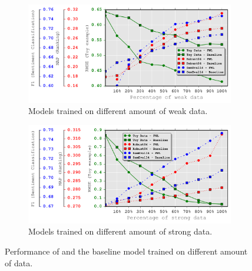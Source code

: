 \begin{figure}[!t]%
    \centering
    \begin{subfigure}[t]{0.7\textwidth}
        \centering
        \includegraphics[width=\textwidth]{03-part-02/chapter-05/figs_and_tables/fig_data_w.png}
        \caption{\label{fig:plot_dw}\footnotesize{Models trained on different amount of weak data.}}
    \end{subfigure}%
    \hfill
    \begin{subfigure}[t]{0.7\textwidth}
        \centering
        \includegraphics[width=\textwidth]{03-part-02/chapter-05/figs_and_tables/fig_data_s.png}
        \caption{\label{fig:plot_dt}\footnotesize{Models trained on different amount of strong data.}}
    \end{subfigure}%
    \caption{Performance of \fwl and the baseline model trained on different amount of data.}
    \label{fig:learning_rate}
\end{figure}